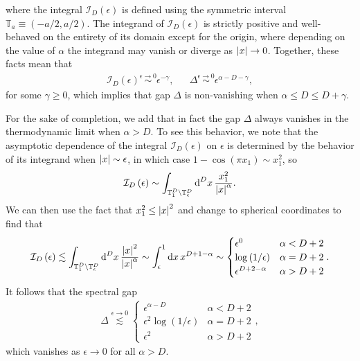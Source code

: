 \documentclass[nofootinbib,notitlepage,11pt]{revtex4-2}
\newcommand{\f}[2]{\dfrac{#1}{#2}} %
\newcommand{\p}[1]{\left(#1\right)} %
\newcommand{\1}{\mathds{1}}
\renewcommand{\d}{\text{d}}
\newcommand{\I}{\mathcal{I}}
\newcommand{\TT}{\mathbb{T}}
\begin{document}
where the integral $\I_D\p{\epsilon}$ is defined using the symmetric
interval $\TT_a\equiv\p{-a/2,a/2}$.  The integrand of
$\I_D\p{\epsilon}$ is strictly positive and well-behaved on the
entirety of its domain except for the origin, where depending on the
value of $\alpha$ the integrand may vanish or diverge as
$\abs{x}\to0$.  Together, these facts mean that
\begin{align}
  \I_D\p{\epsilon} \stackrel{\epsilon\to0}{\sim} \epsilon^{-\gamma},
  &&
  \Delta \stackrel{\epsilon\to0}{\sim} \epsilon^{\alpha-D-\gamma},
\end{align}
for some $\gamma\ge0$, which implies that gap $\Delta$ is
non-vanishing when $\alpha\le D\le D+\gamma$.

For the sake of completion, we add that in fact the gap $\Delta$
always vanishes in the thermodynamic limit when $\alpha>D$.  To see
this behavior, we note that the asymptotic dependence of the integral
$\I_D\p{\epsilon}$ on $\epsilon$ is determined by the behavior of its
integrand when $\abs{x}\sim\epsilon$, in which case
$1-\cos\p{\pi x_1}\sim x_1^2$, so
\begin{align}
  \I_D\p{\epsilon}
  \sim \int_{\TT_1^D\setminus\TT_\epsilon^D} \d^Dx\,
  \f{x_1^2}{\abs{x}^\alpha}.
\end{align}
We can then use the fact that $x_1^2\le\abs{x}^2$ and change to
spherical coordinates to find that
\begin{align}
  \I_D\p{\epsilon} \lesssim
  \int_{\TT_1^D\setminus\TT_\epsilon^D} \d^Dx\,
  \f{\abs{x}^2}{\abs{x}^\alpha}
  \sim \int_\epsilon^1 \d x\, x^{D+1-\alpha}
  \sim
  \begin{cases}
    \epsilon^0 & \alpha < D+2 \\
    \log\p{1/\epsilon} & \alpha = D+2 \\
    \epsilon^{D+2-\alpha} & \alpha > D+2
  \end{cases}.
\end{align}
It follows that the spectral gap
\begin{align}
  \Delta \stackrel{\epsilon\to0}{\lesssim}
  \begin{cases}
    \epsilon^{\alpha-D} & \alpha < D+2 \\
    \epsilon^2 \log\p{1/\epsilon} & \alpha = D + 2 \\
    \epsilon^2 & \alpha > D+2
  \end{cases},
\end{align}
which vanishes as $\epsilon\to0$ for all $\alpha>D$.

\end{document}
